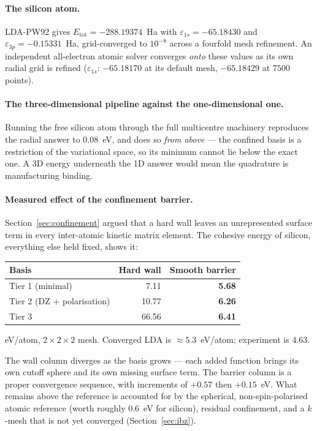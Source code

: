 \documentclass[11pt,a4paper]{article}
\begin{document}
\paragraph{The silicon atom.} LDA-PW92 gives $E_{\text{tot}} =
-288.19374$~Ha with $\varepsilon_{1s} = -65.18430$ and $\varepsilon_{3p} =
-0.15331$~Ha, grid-converged to $10^{-8}$ across a fourfold mesh refinement.
An independent all-electron atomic solver converges \emph{onto} these values
as its own radial grid is refined ($\varepsilon_{1s}$: $-65.18170$ at its
default mesh, $-65.18429$ at $7500$ points).

\paragraph{The three-dimensional pipeline against the one-dimensional one.}
Running the free silicon atom through the full multicentre machinery
reproduces the radial answer to $0.08$~eV, and does so \emph{from above} ---
the confined basis is a restriction of the variational space, so its minimum
cannot lie below the exact one. A 3D energy underneath the 1D answer would
mean the quadrature is manufacturing binding.

\paragraph{Measured effect of the confinement barrier.}
Section~\ref{sec:confinement} argued that a hard wall leaves an unrepresented
surface term in every inter-atomic kinetic matrix element. The cohesive energy
of silicon, everything else held fixed, shows it:

\begin{center}
\small
\begin{tabular}{@{}lrr@{}}
\toprule
Basis & Hard wall & Smooth barrier \\
\midrule
Tier 1 (minimal)      & 7.11 & \textbf{5.68} \\
Tier 2 (DZ + polarisation) & 10.77 & \textbf{6.26} \\
Tier 3                & 66.56 & \textbf{6.41} \\
\bottomrule
\end{tabular}
\par\smallskip
{\footnotesize eV/atom, $2\times2\times2$ mesh. Converged LDA is
$\approx 5.3$~eV/atom; experiment is $4.63$.}
\label{tab:wall}
\end{center}

\noindent
The wall column diverges as the basis grows --- each added function brings its
own cutoff sphere and its own missing surface term. The barrier column is a
proper convergence sequence, with increments of $+0.57$ then $+0.15$~eV. What
remains above the reference is accounted for by the spherical,
non-spin-polarised atomic reference (worth roughly $0.6$~eV for silicon),
residual confinement, and a $k$-mesh that is not yet converged
(Section~\ref{sec:ibz}).
\end{document}
